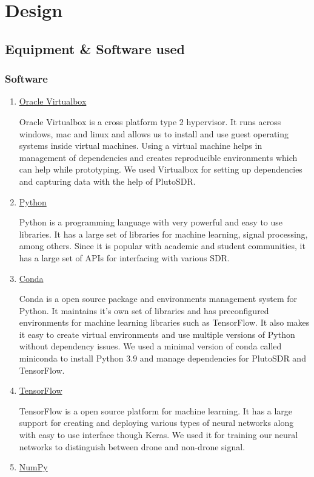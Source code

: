 \chapter{Design} \label{Design}
\section{Equipment \& Software used}
\subsection{Software}
\begin{enumerate}
\item \underline{Oracle  Virtualbox}

  Oracle Virtualbox is a cross platform type 2 hypervisor. It runs across windows, mac and linux and allows us to install and use guest operating systems inside virtual machines. Using a virtual machine helps in management of dependencies and creates reproducible environments which can help while prototyping. We used Virtualbox for setting up dependencies and capturing data with the help of PlutoSDR.
\newpage

\item \underline{Python}

  Python is a programming language with very powerful and easy to use libraries. It has a large set of libraries for machine learning, signal processing, among others. Since it is popular with academic and student communities, it has a large set of APIs for interfacing with various SDR.

\item \underline{Conda}

  Conda is a open source package and environments management system for Python. It maintains it's own set of libraries and has preconfigured environments for machine learning libraries such as TensorFlow. It also makes it easy to create virtual environments and use multiple versions of Python without dependency issues. We used a minimal version of conda called miniconda to install Python 3.9 and manage dependencies for PlutoSDR and TensorFlow.

\item \underline{TensorFlow}

  TensorFlow is a open source platform for machine learning. It has a large support for creating and deploying various types of neural networks along with easy to use interface though Keras. We used it for training our neural networks to distinguish between drone and non-drone signal.
\item \underline{NumPy}


\end{enumerate}
